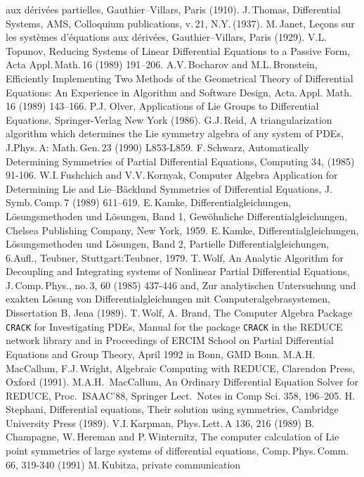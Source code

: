 \begin{thebibliography}{99}
aux d\'{e}riv\'{e}es partielles, Gauthier--Villars, Paris (1910).
 J.\,Thomas, Differential Systems, AMS, Colloquium
publications, v.\,21, N.Y.\,(1937).
 M.\,Janet, Le\c{c}ons sur les syst\`{e}mes d'\'{e}quations aux
d\'{e}riv\'{e}es, Gauthier--Villars, Paris (1929).
 V.L.\,Topunov, Reducing Systems of Linear Differential
Equations to a Passive Form, Acta Appl.\,Math.\,16 (1989) 191--206.
 A.V.\,Bocharov and M.L.\,Bronstein, Efficiently
Implementing Two Methods of the Geometrical Theory of Differential
Equations: An Experience in Algorithm and Software Design, Acta.\,Appl.
Math.\,16 (1989) 143--166.
 P.J. Olver, Applications of Lie Groups to Differential
Equations, Springer-Verlag New York (1986).
 G.J.\,Reid, A triangularization algorithm which
determines the Lie symmetry algebra of any system of PDEs, J.Phys.\,A:
Math.\,Gen.\,23 (1990) L853-L859.
 F.\,Schwarz, Automatically Determining Symmetries of Partial
Differential Equations, Computing 34, (1985) 91-106.
 W.I.\,Fushchich and V.V.\,Kornyak, Computer Algebra
Application for Determining Lie and Lie--B\"{a}cklund Symmetries of
Differential Equations, J.\,Symb.\,Comp.\,7 (1989) 611--619.
 E.\,Kamke, Differentialgleichungen, L\"{o}sungsmethoden
und L\"{o}sungen, Band 1, Gew\"{o}hnliche Differentialgleichungen,
Chelsea Publishing Company, New York, 1959.
 E.\,Kamke, Differentialgleichungen, L\"{o}sungsmethoden
und L\"{o}sungen, Band 2, Partielle Differentialgleichungen, 6.Aufl.,
Teubner, Stuttgart:Teubner, 1979.
 T.\,Wolf, An Analytic Algorithm for Decoupling and Integrating
systems of Nonlinear Partial Differential Equations, J.\,Comp.\,Phys.,
no.\,3, 60 (1985) 437-446 and, Zur analytischen Untersuchung und exakten
L\"{o}sung von Differentialgleichungen mit Computeralgebrasystemen,
Dissertation B, Jena (1989).
 T.\,Wolf, A. Brand, The Computer Algebra Package {\tt CRACK}
      for Investigating PDEs, Manual for the package {\tt CRACK} in the REDUCE
      network library and in Proceedings of ERCIM School on Partial 
      Differential Equations and Group Theory, April 1992 in Bonn, GMD Bonn.
 M.A.H.\,MacCallum, F.J.\,Wright, Algebraic Computing with REDUCE,
Clarendon Press, Oxford (1991).
 M.A.H.\, MacCallum, An Ordinary Differential Equation
Solver for REDUCE, Proc.\, ISAAC'88, Springer Lect.\, Notes in Comp Sci.
358, 196--205.
 H.\,Stephani, Differential equations, Their solution using
symmetries, Cambridge University Press (1989).
 V.I.\,Karpman, Phys.\,Lett.\,A 136, 216 (1989)
 B.\,Champagne, W.\,Hereman and P.\,Winternitz, The computer
      calculation of Lie point symmetries of large systems of differential
      equations, Comp.\,Phys.\,Comm.\,66, 319-340 (1991)
 M.\,Kubitza, private communication

\end{thebibliography}


